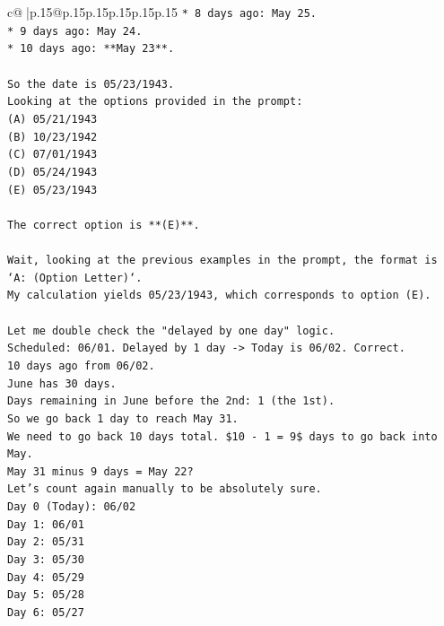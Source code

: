 \documentclass{article}
\begin{document}
{\begin{supertabular}{c@{$\;$}|p{.15\linewidth}@{}p{.15\linewidth}p{.15\linewidth}p{.15\linewidth}p{.15\linewidth}p{.15\linewidth}}
{{{\texttt{*   8 days ago: May 25.} \\
\texttt{*   9 days ago: May 24.} \\
\texttt{*   10 days ago: **May 23**.} \\
\\ 
\texttt{So the date is 05/23/1943.} \\
\texttt{Looking at the options provided in the prompt:} \\
\texttt{(A) 05/21/1943} \\
\texttt{(B) 10/23/1942} \\
\texttt{(C) 07/01/1943} \\
\texttt{(D) 05/24/1943} \\
\texttt{(E) 05/23/1943} \\
\\ 
\texttt{The correct option is **(E)**.} \\
\\ 
\texttt{Wait, looking at the previous examples in the prompt, the format is `A: (Option Letter)`.} \\
\texttt{My calculation yields 05/23/1943, which corresponds to option (E).} \\
\\ 
\texttt{Let me double check the "delayed by one day" logic.} \\
\texttt{Scheduled: 06/01. Delayed by 1 day {-}> Today is 06/02. Correct.} \\
\texttt{10 days ago from 06/02.} \\
\texttt{June has 30 days.} \\
\texttt{Days remaining in June before the 2nd: 1 (the 1st).} \\
\texttt{So we go back 1 day to reach May 31.} \\
\texttt{We need to go back 10 days total. \$10 {-} 1 = 9\$ days to go back into May.} \\
\texttt{May 31 minus 9 days = May 22?} \\
\texttt{Let's count again manually to be absolutely sure.} \\
\texttt{Day 0 (Today): 06/02} \\
\texttt{Day 1: 06/01} \\
\texttt{Day 2: 05/31} \\
\texttt{Day 3: 05/30} \\
\texttt{Day 4: 05/29} \\
\texttt{Day 5: 05/28} \\
\texttt{Day 6: 05/27} \\
}}}
\end{supertabular}}
\end{document}
